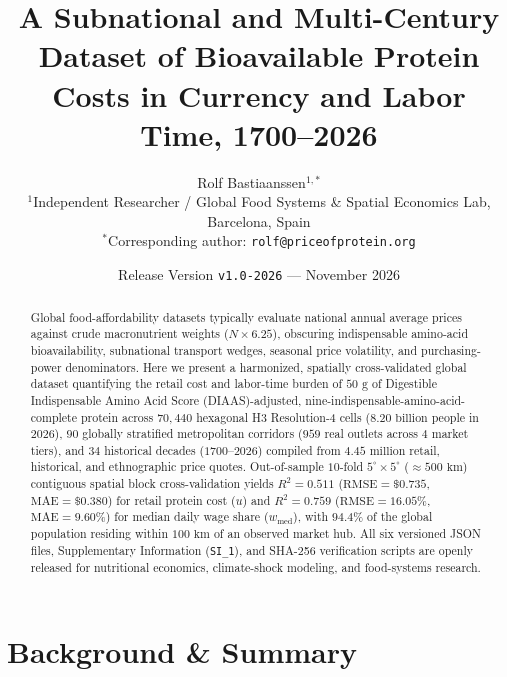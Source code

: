\documentclass[11pt,a4paper]{article}
\title{\textbf{A Subnational and Multi-Century Dataset of Bioavailable Protein Costs in Currency and Labor Time, 1700--2026}}
\author{
Rolf Bastiaanssen$^{1,*}$ \\
\small $^{1}$Independent Researcher / Global Food Systems \& Spatial Economics Lab, Barcelona, Spain \\
\small $^{*}$Corresponding author: \texttt{rolf@priceofprotein.org}
}
\date{Release Version \texttt{v1.0-2026} --- November 2026}
\begin{document}
\maketitle

\begin{abstract}
Global food-affordability datasets typically evaluate national annual average prices against crude macronutrient weights ($N \times 6.25$), obscuring indispensable amino-acid bioavailability, subnational transport wedges, seasonal price volatility, and purchasing-power denominators. Here we present a harmonized, spatially cross-validated global dataset quantifying the retail cost and labor-time burden of $50\text{ g}$ of Digestible Indispensable Amino Acid Score (DIAAS)-adjusted, nine-indispensable-amino-acid-complete protein across $70{,}440$ hexagonal H3 Resolution-4 cells ($8.20\text{ billion}$ people in $2026$), $90$ globally stratified metropolitan corridors ($959$ real outlets across $4$ market tiers), and $34$ historical decades ($1700\text{--}2026$) compiled from $4.45\text{ million}$ retail, historical, and ethnographic price quotes. Out-of-sample $10$-fold $5^\circ \times 5^\circ$ ($\approx 500\text{ km}$) contiguous spatial block cross-validation yields $R^2 = 0.511$ ($\text{RMSE} = \$0.735$, $\text{MAE} = \$0.380$) for retail protein cost ($u$) and $R^2 = 0.759$ ($\text{RMSE} = 16.05\%$, $\text{MAE} = 9.60\%$) for median daily wage share ($w_{\text{med}}$), with $94.4\%$ of the global population residing within $100\text{ km}$ of an observed market hub. All six versioned JSON files, Supplementary Information (\texttt{SI\_1}), and SHA-256 verification scripts are openly released for nutritional economics, climate-shock modeling, and food-systems research.
\end{abstract}

\section{Background \& Summary}
\end{document}
